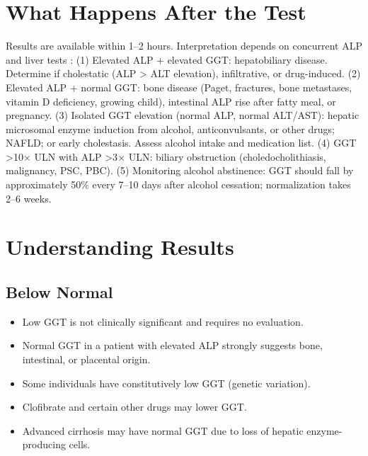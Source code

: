 \section*{What Happens After the Test}
Results are available within 1--2 hours. Interpretation depends on concurrent ALP and liver tests \cite{kwo2017acg}: (1) Elevated ALP + elevated GGT: hepatobiliary disease. Determine if cholestatic (ALP > ALT elevation), infiltrative, or drug-induced. (2) Elevated ALP + normal GGT: bone disease (Paget, fractures, bone metastases, vitamin D deficiency, growing child), intestinal ALP rise after fatty meal, or pregnancy. (3) Isolated GGT elevation (normal ALP, normal ALT/AST): hepatic microsomal enzyme induction from alcohol, anticonvulsants, or other drugs; NAFLD; or early cholestasis. Assess alcohol intake and medication list. (4) GGT >10$\times$ ULN with ALP >3$\times$ ULN: biliary obstruction (choledocholithiasis, malignancy, PSC, PBC). (5) Monitoring alcohol abstinence: GGT should fall by approximately 50\% every 7--10 days after alcohol cessation; normalization takes 2--6 weeks.

\section*{Understanding Results}

\subsection*{Below Normal}
\begin{itemize}
  \item Low GGT is not clinically significant and requires no evaluation.
  \item Normal GGT in a patient with elevated ALP strongly suggests bone, intestinal, or placental origin.
  \item Some individuals have constitutively low GGT (genetic variation). \cite{schiele1977gamma}
  \item Clofibrate and certain other drugs may lower GGT.
  \item Advanced cirrhosis may have normal GGT due to loss of hepatic enzyme-producing cells.
\end{itemize}

